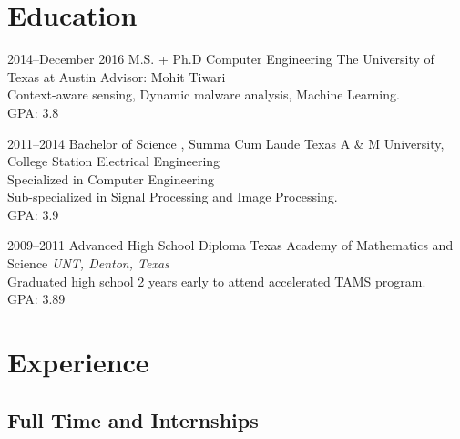 \documentclass[]{friggeri-cv} %
\begin{document}

\section{Education}

\begin{entrylist}


\entry
{2014--December 2016}
{M.S. + Ph.D {\normalfont Computer Engineering}}
{The University of Texas at Austin}
{Advisor: Mohit Tiwari \\ Context-aware sensing, Dynamic malware analysis, Machine Learning. \\ GPA: 3.8}


\entry
{2011--2014}
{Bachelor of Science {\normalfont, Summa Cum Laude}}
{Texas A \& M University, College Station}
{Electrical Engineering \\ Specialized in Computer Engineering \\ Sub-specialized in Signal Processing and Image Processing. \\ GPA: 3.9}


\entry
{2009--2011}
{Advanced High School Diploma}
{Texas Academy of Mathematics and Science}
{\emph{UNT, Denton, Texas}
 \\ Graduated high school 2 years early to attend accelerated TAMS program. \\ GPA: 3.89}

\end{entrylist}


\section{Experience}

\subsection{Full Time and Internships}
\end{document}
